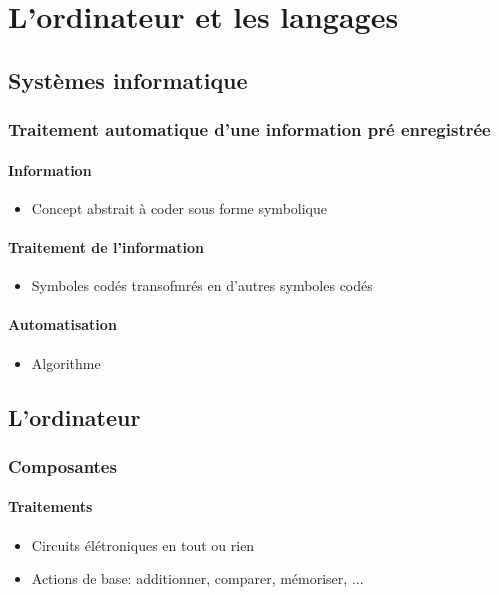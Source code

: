 \chapter{L'ordinateur et les langages}
	\section{Systèmes informatique}
		\subsection{Traitement automatique d'une information pré enregistrée}
			\subsubsection{Information}
				\begin{itemize}
					\item[\textbullet] Concept abstrait à coder sous forme symbolique
				\end{itemize}
			\subsubsection{Traitement de l'information}	
				\begin{itemize}
					\item[\textbullet] Symboles codés transofmrés en d'autres symboles codés
				\end{itemize}
			\subsubsection{Automatisation}
				\begin{itemize}
					\item[\textbullet] Algorithme
				\end{itemize}
	\section{L'ordinateur}
		\subsection{Composantes}
			\subsubsection{Traitements}
				\begin{itemize}
					\item[\textbullet] Circuits élétroniques en tout ou rien
					\item[\textbullet] Actions de base: additionner, comparer, mémoriser, ...
				\end{itemize}
